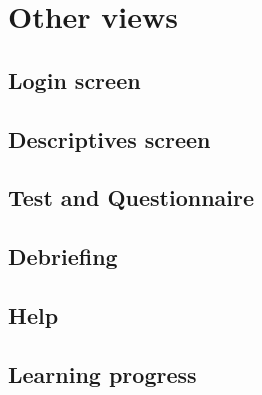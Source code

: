 \section{Other views}
\subsection{Login screen}
\subsection{Descriptives screen}
\subsection{Test and Questionnaire}
\subsection{Debriefing}
\subsection{Help}
\subsection{Learning progress}
\label{sec:learningprogress}
